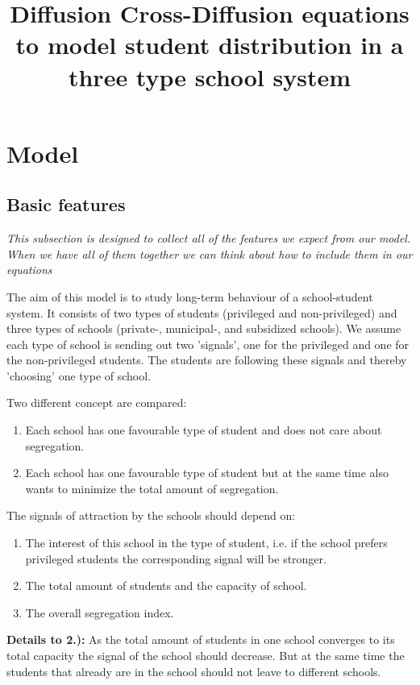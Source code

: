 \documentclass[12pt,a4paper]{article}
\title{Diffusion Cross-Diffusion equations to model student distribution in a three type school system}
\newcommand{\ita}[1]{\textit{#1}}
\newcommand{\bol}[1]{\textbf{#1}}
\begin{document}
\maketitle

\section{Model}

\subsection{Basic features}
\ita{This subsection is designed to collect all of the features we expect from our model. When we have all of them together we can think about how to include them in our equations}

The aim of this model is to study long-term behaviour of a school-student system. It consists of two types of students (privileged and non-privileged) and three types of schools (private-, municipal-, and subsidized schools). We assume each type of school is sending out two 'signals', one for the privileged and one for the non-privileged students. The students are following these signals and thereby 'choosing' one type of school. 
 
Two different concept are compared: 
\begin{enumerate}
\item Each school has one favourable type of student and does not care about segregation.
\item Each school has one favourable type of student but at the same time also wants to minimize the total amount of segregation. 
\end{enumerate}


The signals of attraction by the schools should depend on:
\begin{enumerate}
\item The interest of this school in the type of student, i.e. if the school prefers privileged students the corresponding signal will be stronger.
\item The total amount of students and the capacity of school. 
\item The overall segregation index.
\end{enumerate}

\bol{Details to 2.):} As the total amount of students in one school converges to its total capacity the signal of the school should decrease. But at the same time the students that already are in the school should not leave to different schools. 
\end{document}
